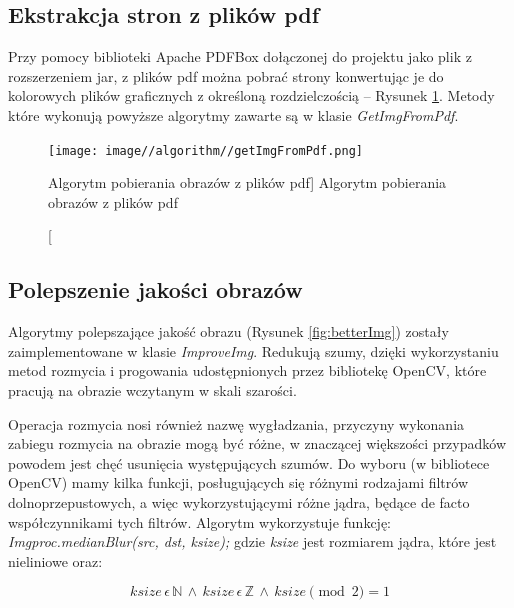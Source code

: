 \documentclass[a4paper,12pt]{article}
\newcommand\spacingIndent{2.2em}
\begin{document}
	\subsection{Ekstrakcja stron z plików pdf}
		\hspace{\spacingIndent} Przy pomocy biblioteki Apache PDFBox dołączonej do projektu jako plik z rozszerzeniem jar, z plików pdf można pobrać strony konwertując je do kolorowych plików graficznych z określoną rozdzielczością -- Rysunek \ref{fig:fromPdf}. Metody które wykonują powyższe algorytmy zawarte są w klasie \textit{GetImgFromPdf}.

        
		\begin{figure}[!ht]  
			\begin{center}
				\texttt{[image: image//algorithm//getImgFromPdf.png]}%
			\end{center}
			\caption
    			[Algorytm pobierania obrazów z plików pdf]  
	    		{Algorytm pobierania obrazów z plików pdf}  
	    		\label{fig:fromPdf}
		\end{figure}
		\newpage
		\subsection{Polepszenie jakości obrazów}
			\hspace{\spacingIndent} Algorytmy polepszające jakość obrazu (Rysunek \ref{fig:betterImg}) zostały zaimplementowane w klasie           \textit{ImproveImg}. Redukują szumy, dzięki wykorzystaniu metod rozmycia i        progowania udostępnionych przez bibliotekę OpenCV, które pracują na         obrazie wczytanym w skali szarości.  
			
			    Operacja rozmycia nosi również nazwę wygładzania, przyczyny wykonania zabiegu rozmycia na obrazie mogą być różne, w znaczącej większości przypadków powodem jest chęć usunięcia występujących szumów. Do wyboru (w bibliotece OpenCV) mamy kilka funkcji, posługujących się różnymi rodzajami filtrów dolnoprzepustowych, a więc wykorzystującymi różne jądra, będące de facto współczynnikami tych filtrów. Algorytm wykorzystuje funkcję:
			    \textit{Imgproc.medianBlur(src, dst, ksize);}
			    gdzie \textit{ksize} jest rozmiarem jądra, które jest nieliniowe oraz:  
			    
			    \begin{displaymath}
                    ksize\, \epsilon\, \mathbb{N}\, \wedge\, ksize\, \epsilon\, \mathbb{Z}\, \wedge\, ksize\pmod{2} = 1
                \end{displaymath}
                
\end{document}
